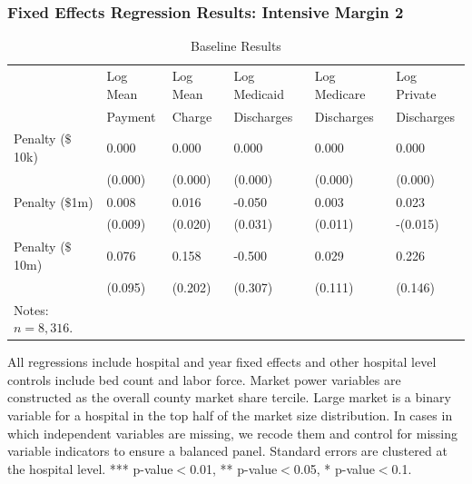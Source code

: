 \documentclass[ucs,9pt]{beamer}
\begin{document}
\begin{frame}
\frametitle{Fixed Effects Regression Results: Intensive Margin 2}
\begin{table}[htp]
\centering \normalsize
\caption{Baseline Results}
\label{tab:samplemort}
\footnotesize
\begin{tabular}{llllll}
\hline	
 			& Log Mean		& Log Mean		& Log Medicaid 	   	& Log Medicare   		& Log Private  			\\
			& Payment		& 	Charge		& Discharges      		& Discharges       		& Discharges        	\\
\hline
Penalty ($\$$10k) &	0.000	&	0.000	&	0.000	&	0.000	&	0.000	\\
	&	(0.000)	&	(0.000)	&	(0.000)	&	(0.000)	&	(0.000)	\\
Penalty ($\$$1m) 	&	0.008	&	0.016	&	-0.050	&	0.003	&	0.023	\\
	&	(0.009)	&	(0.020)	&	(0.031)	&	(0.011)	&	-(0.015)	\\
Penalty ($\$$10m)	&	0.076	&	0.158	&	-0.500	&	0.029	&	0.226	\\
	&	(0.095)	&	(0.202)	&	(0.307)	&	(0.111)	&	(0.146)	\\
\hline
\tiny Notes: $n=8,316$.  
\end{tabular}
\end{table}
\tiny All regressions include hospital and year fixed effects and other hospital level controls include bed count and labor force.  Market power variables are constructed as the overall county market share tercile.  Large market is a binary variable for a hospital in the top half of the market size distribution.  In cases in which independent variables are missing, we recode them and control for missing variable indicators to ensure a balanced panel.  Standard errors are clustered at the hospital level.  *** p-value$<$0.01, ** p-value$<$0.05, * p-value$<$0.1.
\end{frame}
\end{document}
